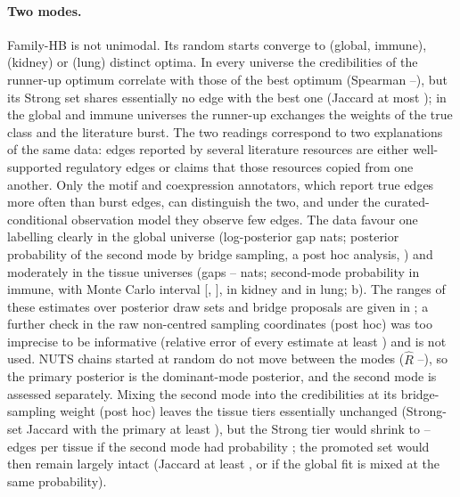 \paragraph{Two modes.}
Family-HB is not unimodal.
Its \nMapRestartsHb{} random starts converge to \nHbNoptGlobImm{} (global, immune), \nHbNoptKid{} (kidney) or \nHbNoptLung{} (lung) distinct optima.
In every universe the credibilities of the runner-up optimum correlate with those of the best optimum (Spearman \nHbSpTwoMin{}--\nHbSpTwoMax{}), but its Strong set shares essentially no edge with the best one (Jaccard at most \nHbJacTwoMax{}); in the global and immune universes the runner-up exchanges the weights of the true class and the literature burst.
The two readings correspond to two explanations of the same data: edges reported by several literature resources are either well-supported regulatory edges or claims that those resources copied from one another.
Only the motif and coexpression annotators, which report true edges more often than burst edges, can distinguish the two, and under the curated-conditional observation model they observe few edges.
The data favour one labelling clearly in the global universe (log-posterior gap \nHbGapGlob{} nats; posterior probability of the second mode by bridge sampling, a post hoc analysis, \nBridgePGlob{}) and moderately in the tissue universes (gaps \nHbGapTisMin{}--\nHbGapTisMax{} nats; second-mode probability \nBridgePImm{} in immune, with Monte Carlo interval [\nBridgePImmLo{}, \nBridgePImmHi{}], \nBridgePKid{} in kidney and \nBridgePLung{} in lung; b).
The ranges of these estimates over posterior draw sets and bridge proposals are given in ; a further check in the raw non-centred sampling coordinates (post hoc) was too imprecise to be informative (relative error of every estimate at least \nBridgeNcReMin{}) and is not used.
NUTS chains started at random do not move between the modes ($\widehat{R}$ \nRandRhatMin{}--\nRandRhatMax{}), so the primary posterior is the dominant-mode posterior, and the second mode is assessed separately.
Mixing the second mode into the credibilities at its bridge-sampling weight (post hoc) leaves the tissue tiers essentially unchanged (Strong-set Jaccard with the primary at least \nMgJacBridgeMin{}), but the Strong tier would shrink to \nMgStrongFiveMin{}--\nMgStrongFiveMax{} edges per tissue if the second mode had probability \nMgPFive{}; the promoted set would then remain largely intact (Jaccard at least \nMgPromFiveMin{}, or \nMgPromFiveSameMin{} if the global fit is mixed at the same probability).

